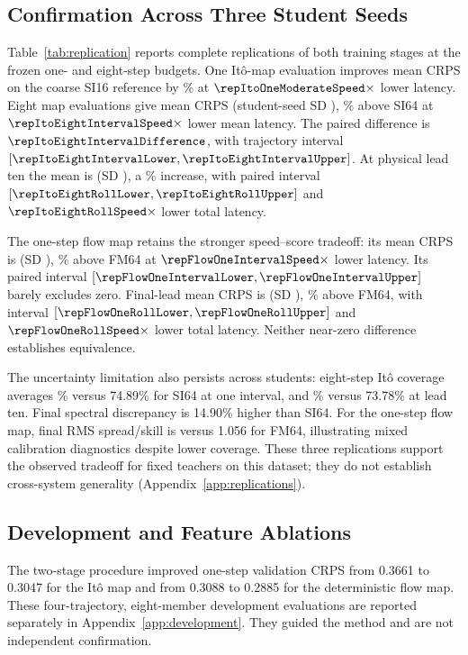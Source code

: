 \subsection{Confirmation Across Three Student Seeds}
Table~\ref{tab:replication} reports complete replications of both training stages at the frozen one- and eight-step budgets. One It\^o-map evaluation improves mean CRPS on the coarse SI16 reference by \repItoOneModerateGain\% at $\repItoOneModerateSpeed\times$ lower latency. Eight map evaluations give mean CRPS \repItoEightIntervalCRPS{} (student-seed SD \repItoEightIntervalSD), \repItoEightIntervalPercent\% above SI64 at $\repItoEightIntervalSpeed\times$ lower mean latency. The paired difference is $\repItoEightIntervalDifference$, with trajectory interval $[\repItoEightIntervalLower,\repItoEightIntervalUpper]$. At physical lead ten the mean is \repItoEightRollCRPS{} (SD \repItoEightRollSD), a \repItoEightRollPercent\% increase, with paired interval $[\repItoEightRollLower,\repItoEightRollUpper]$ and $\repItoEightRollSpeed\times$ lower total latency.

The one-step flow map retains the stronger speed--score tradeoff: its mean CRPS is \repFlowOneIntervalCRPS{} (SD \repFlowOneIntervalSD), \repFlowOneIntervalPercent\% above FM64 at $\repFlowOneIntervalSpeed\times$ lower latency. Its paired interval $[\repFlowOneIntervalLower,\repFlowOneIntervalUpper]$ barely excludes zero. Final-lead mean CRPS is \repFlowOneRollCRPS{} (SD \repFlowOneRollSD), \repFlowOneRollPercent\% above FM64, with interval $[\repFlowOneRollLower,\repFlowOneRollUpper]$ and $\repFlowOneRollSpeed\times$ lower total latency. Neither near-zero difference establishes equivalence.

The uncertainty limitation also persists across students: eight-step It\^o coverage averages \repItoEightIntervalCoverage\% versus 74.89\% for SI64 at one interval, and \repItoEightRollCoverage\% versus 73.78\% at lead ten. Final spectral discrepancy is 14.90\% higher than SI64. For the one-step flow map, final RMS spread/skill is \repFlowOneRollRatio{} versus 1.056 for FM64, illustrating mixed calibration diagnostics despite lower coverage. These three replications support the observed tradeoff for fixed teachers on this dataset; they do not establish cross-system generality (Appendix~\ref{app:replications}).

\subsection{Development and Feature Ablations}
The two-stage procedure improved one-step validation CRPS from 0.3661 to 0.3047 for the It\^o map and from 0.3088 to 0.2885 for the deterministic flow map. These four-trajectory, eight-member development evaluations are reported separately in Appendix~\ref{app:development}. They guided the method and are not independent confirmation.

